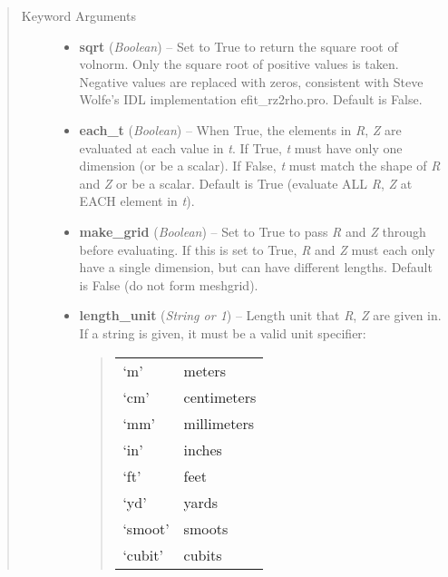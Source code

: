 \documentclass[letterpaper,10pt,english]{sphinxmanual}
\begin{document}
\begin{fulllineitems}
\begin{fulllineitems}
\begin{quote}
\begin{description}
\begin{itemize}
\end{itemize}

\item[{Keyword Arguments}] \leavevmode\begin{itemize}
\item {} 
\textbf{sqrt} (\emph{Boolean}) --
Set to True to return the square root of volnorm.
Only the square root of positive values is taken. Negative
values are replaced with zeros, consistent with Steve Wolfe's
IDL implementation efit\_rz2rho.pro. Default is False.

\item {} 
\textbf{each\_t} (\emph{Boolean}) --
When True, the elements in \emph{R}, \emph{Z} are evaluated
at each value in \emph{t}. If True, \emph{t} must have only one dimension
(or be a scalar). If False, \emph{t} must match the shape of \emph{R} and
\emph{Z} or be a scalar. Default is True (evaluate ALL \emph{R}, \emph{Z} at
EACH element in \emph{t}).

\item {} 
\textbf{make\_grid} (\emph{Boolean}) --
Set to True to pass \emph{R} and \emph{Z} through
 before evaluating. If this is set to
True, \emph{R} and \emph{Z} must each only have a single dimension, but
can have different lengths. Default is False (do not form
meshgrid).

\item {} 
\textbf{length\_unit} (\emph{String or 1}) --
Length unit that \emph{R}, \emph{Z} are given in.
If a string is given, it must be a valid unit specifier:
\begin{quote}

\begin{tabulary}{\linewidth}{|L|L|}
\hline

`m'
 & 
meters
\\

`cm'
 & 
centimeters
\\

`mm'
 & 
millimeters
\\

`in'
 & 
inches
\\

`ft'
 & 
feet
\\

`yd'
 & 
yards
\\

`smoot'
 & 
smoots
\\

`cubit'
 & 
cubits
\\


\end{tabulary}
\end{quote}
\end{itemize}
\end{description}
\end{quote}
\end{fulllineitems}
\end{fulllineitems}
\end{document}
